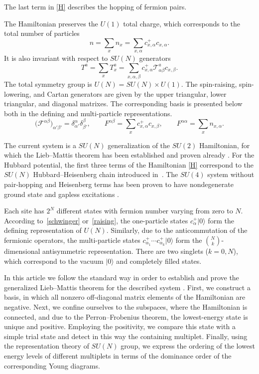 \documentclass[pdftex]{sigma}
\begin{document}
The last term   in \eqref{H} describes the hopping of
fermion pairs.

The Hamiltonian preserves the $U(1)$ total charge, which corresponds to the total number
of particles
\begin{equation*}
n=\sum_{x} n_x=\sum_{x,\alpha}c_{x,\alpha}^+c_{x,\alpha}.
\end{equation*}
It is also invariant with respect to $SU(N)$ generators
\begin{equation*}
T^a=\sum_x T^a_x= \sum_{x,\alpha,\beta}c_{x,\alpha}^+ \mathcal{T}^a_{\alpha\beta}c_{x,\beta}.
\end{equation*}
The total symmetry group is $U(N)=SU(N)\times U(1)$.
The spin-raising, spin-lowering, and Cartan generators are given by
the upper triangular, lower triangular, and diagonal
matrixes. The corresponding basis is presented below
both in the def\/ining and multi-particle representations.
\begin{equation}
\label{raising}
\big(\mathcal{F}^{\alpha\beta}\big)_{\alpha'\beta'}=\delta^\alpha_{\alpha'}\delta^\beta_{\beta'},
\qquad
F^{\alpha\beta}=\sum_x c_{x,\alpha}^+ c_{x,\beta},
\qquad
F^{\alpha\alpha}=\sum_x n_{x,\alpha}.
\end{equation}

The current system  is a $SU(N)$ generalization of the $SU(2)$ Hamiltonian,
for which the Lieb--Mattis theorem  has been established
and proven already \cite{Amb92-2}.
For the Hubbard potential, the
f\/irst three terms of the Hamiltonian \eqref{H}
correspond to the $SU(N)$ Hubbard--Heisenberg chain
introduced in~\cite{MA89}.
The $SU(4)$ system without pair-hopping and Heisenberg terms has been proven to have  nondegenerate
ground state and gapless excitations \cite{LTML04}.

Each site has $2^N$ dif\/ferent states with fermion number varying from
zero to $N$.
According to~\eqref{schwinger} or~\eqref{raising},
the one-particle states $c^+_{\alpha}|0\rangle$ form the def\/ining
representation of $U(N)$.
Similarly, due to the anticommutation of the fermionic operators,
the multi-particle states $c^+_{\alpha_1}\cdots c^+_{\alpha_k}|0\rangle $
form the $\binom{N}{k}$-dimensional antisymmetric representation.
There are two singlets ($k=0,N$), which correspond to
the vacuum $|0\rangle $ and completely f\/illed states.

In this article we follow the standard way in order to establish and prove the generalized Lieb--Mattis
theorem for the described system \cite{LM62,H07}. First, we construct a basis, in which all
nonzero of\/f-diagonal matrix elements of the Hamiltonian are negative.
Next, we conf\/ine ourselves to the subspaces, where the Hamiltonian is connected,
and due to the Perron--Frobenius theorem, the lowest-energy state
is unique and positive. Employing the positivity, we compare this state with a simple trial state
and detect in this way  the containing multiplet.
Finally, using the representation theory of $SU(N)$ group, we express the ordering
of the lowest energy levels of dif\/ferent multiplets in terms of the dominance
order of the corresponding Young diagrams.
\end{document}
